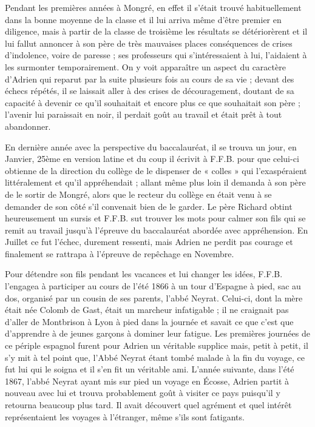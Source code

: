 \documentclass[11pt,a4paper]{report}
\begin{document}
Pendant les premières années à Mongré, en effet il s'était trouvé habituellement dans la bonne moyenne de la classe et il lui arriva même d'être premier en diligence, mais à partir de la classe de troisième les résultats se détériorèrent et il lui fallut annoncer à son père de très mauvaises places conséquences de crises d'indolence, voire de paresse ; ses professeurs qui s'intéressaient à lui, l'aidaient à les surmonter temporairement. On y voit apparaître un aspect du caractère d'Adrien qui reparut par la suite plusieurs fois au cours de sa vie ; devant des échecs répétés, il se laissait aller à des crises de découragement, doutant de sa capacité à devenir ce qu'il souhaitait et encore plus ce que souhaitait son père ; l'avenir lui paraissait en noir, il perdait goût au travail et était prêt à tout abandonner.


En dernière année avec la perspective du baccalauréat, il se trouva un jour, en Janvier, 25ème en version latine et du coup il écrivit à F.F.B. pour que celui-ci obtienne de la direction du collège de le dispenser de « colles » qui l'exaspéraient littéralement et qu'il appréhendait ; allant même plus loin il demanda à son père de le sortir de Mongré, alors que le recteur du collège en était venu à se demander de son côté s'il convenait bien de le garder. Le père Richard obtint heureusement un sursis et F.F.B. sut trouver les mots pour calmer son fils qui se remit au travail jusqu'à l'épreuve du baccalauréat abordée avec appréhension. En Juillet ce fut l'échec, durement ressenti, mais Adrien ne perdit pas courage et finalement se rattrapa à l'épreuve de repêchage en Novembre.

Pour détendre son fils pendant les vacances et lui changer les idées, F.F.B. l'engagea à participer au cours de l'été 1866 à un tour d'Espagne à pied, sac au dos, organisé par un cousin de ses parents, l'abbé Neyrat. Celui-ci, dont la mère était née Colomb de Gast, était un marcheur infatigable ; il ne craignait pas d'aller de Montbrison à Lyon à pied dans la journée et savait ce que c'est que d'apprendre à de jeunes garçons à dominer leur fatigue. Les premières journées de ce périple espagnol furent pour Adrien un véritable supplice mais, petit à petit, il s'y mit à tel point que, l'Abbé Neyrat étant tombé malade à la fin du voyage, ce fut lui qui le soigna et il s'en fit un véritable ami. L'année suivante, dans l'été 1867, l'abbé Neyrat ayant mis sur pied un voyage en Écosse, Adrien partit à nouveau avec lui et trouva probablement goût à visiter ce pays puisqu'il y retourna beaucoup plus tard. Il avait découvert quel agrément et quel intérêt représentaient les voyages à l'étranger, même s'ils sont fatigants.
\end{document}
